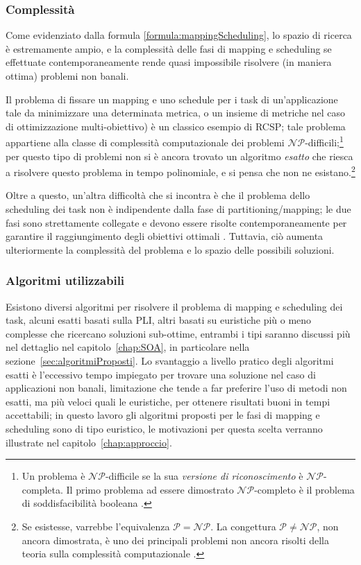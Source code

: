 \subsubsection{Complessità}
Come evidenziato dalla formula \eqref{formula:mappingScheduling}, lo spazio di ricerca è 
estremamente ampio, e la complessità delle fasi di mapping e scheduling se effettuate 
contemporaneamente rende quasi impossibile risolvere (in maniera ottima) problemi non 
banali.

Il problema di fissare un mapping e uno schedule per i task di un'applicazione
tale da minimizzare una determinata metrica, o un insieme di metriche nel caso
di ottimizzazione multi-obiettivo) è un classico esempio di \ac{RCSP}; tale
problema appartiene alla classe di complessità computazionale dei problemi
$\mathcal{NP}$-difficili;\footnote{Un problema \`e $\mathcal{NP}$-difficile se la sua \emph{versione
di riconoscimento} \`e $\mathcal{NP}$-completa. Il primo problema ad essere dimostrato
$\mathcal{NP}$-completo \`e il problema di soddisfacibilit\`a booleana \cite{CookSAT}.} per questo tipo di problemi non si è ancora
trovato un algoritmo \emph{esatto} che riesca a risolvere questo problema in
tempo polinomiale, e si pensa che non ne esistano.\footnote{Se esistesse,
varrebbe l'equivalenza $\mathcal{P} = \mathcal{NP}$. La congettura $\mathcal{P} \neq \mathcal{NP}$, non ancora
dimostrata, \`e uno dei principali problemi non ancora risolti della teoria sulla
complessit\`a computazionale \cite{GasarchPoll}.}

Oltre a questo, un'altra difficoltà che si incontra è che il problema dello
scheduling dei task non è indipendente dalla fase di partitioning/mapping; le
due fasi sono strettamente collegate e devono essere risolte contemporaneamente
per garantire il raggiungimento degli obiettivi ottimali
\cite{AntColonyOptimization}. Tuttavia, ciò aumenta ulteriormente la
complessità del problema e lo spazio delle possibili soluzioni.


\subsubsection{Algoritmi utilizzabili} Esistono diversi algoritmi per risolvere
il problema di mapping e scheduling dei task, alcuni esatti basati sulla
\ac{PLI}, altri basati su euristiche più o meno complesse che ricercano
soluzioni sub-ottime, entrambi i tipi saranno discussi più nel dettaglio nel
capitolo~\ref{chap:SOA}, in particolare nella
sezione~\ref{sec:algoritmiProposti}.  Lo svantaggio a livello pratico degli
algoritmi esatti è l'eccessivo tempo impiegato per trovare una soluzione nel caso di
applicazioni non banali, limitazione che tende a far preferire l'uso di metodi
non esatti, ma più veloci quali le euristiche, per ottenere risultati buoni in
tempi accettabili; in questo lavoro gli algoritmi proposti per le fasi di
mapping e scheduling sono di tipo euristico, le motivazioni per questa scelta verranno
illustrate nel capitolo~\ref{chap:approccio}.

